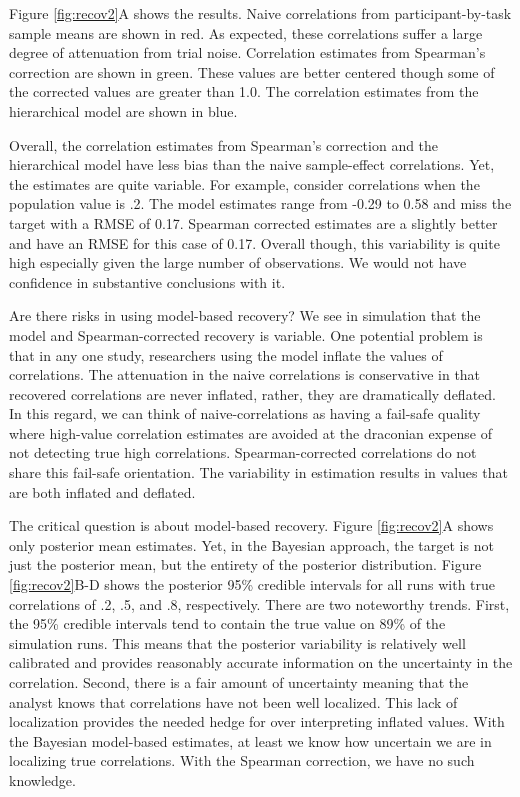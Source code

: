 \documentclass[
  english,
  ,man]{apa6}
\begin{document}
Figure \ref{fig:recov2}A shows the results. Naive correlations from participant-by-task sample means are shown in red. As expected, these correlations suffer a large degree of attenuation from trial noise. Correlation estimates from Spearman's correction are shown in green. These values are better centered though some of the corrected values are greater than 1.0. The correlation estimates from the hierarchical model are shown in blue.

Overall, the correlation estimates from Spearman's correction and the hierarchical model have less bias than the naive sample-effect correlations. Yet, the estimates are quite variable. For example, consider correlations when the population value is .2. The model estimates range from -0.29 to 0.58 and miss the target with a RMSE of 0.17. Spearman corrected estimates are a slightly better and have an RMSE for this case of 0.17. Overall though, this variability is quite high especially given the large number of observations. We would not have confidence in substantive conclusions with it.

Are there risks in using model-based recovery? We see in simulation that the model and Spearman-corrected recovery is variable. One potential problem is that in any one study, researchers using the model inflate the values of correlations. The attenuation in the naive correlations is conservative in that recovered correlations are never inflated, rather, they are dramatically deflated. In this regard, we can think of naive-correlations as having a fail-safe quality where high-value correlation estimates are avoided at the draconian expense of not detecting true high correlations. Spearman-corrected correlations do not share this fail-safe orientation. The variability in estimation results in values that are both inflated and deflated.

The critical question is about model-based recovery. Figure \ref{fig:recov2}A shows only posterior mean estimates. Yet, in the Bayesian approach, the target is not just the posterior mean, but the entirety of the posterior distribution. Figure \ref{fig:recov2}B-D shows the posterior 95\% credible intervals for all runs with true correlations of .2, .5, and .8, respectively. There are two noteworthy trends. First, the 95\% credible intervals tend to contain the true value on 89\% of the simulation runs. This means that the posterior variability is relatively well calibrated and provides reasonably accurate information on the uncertainty in the correlation. Second, there is a fair amount of uncertainty meaning that the analyst knows that correlations have not been well localized. This lack of localization provides the needed hedge for over interpreting inflated values. With the Bayesian model-based estimates, at least we know how uncertain we are in localizing true correlations. With the Spearman correction, we have no such knowledge.
\end{document}
